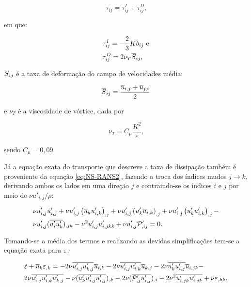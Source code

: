\begin{equation}
    \tau_{ij}=\tau_{ij}^I+\tau_{ij}^D\text{,}
\end{equation}

\noindent em que:

\begin{subequations}
    \begin{align}
         & \tau_{ij}^I=-\frac{2}{3}K\delta_{ij}\text{ e} \\
         & \tau_{ij}^D=2\nu_T\overline{S}_{ij}\text{,}
    \end{align}
\end{subequations}

\noindent $\overline{S}_{ij}$ é a taxa de deformação do campo de velocidades média:

\begin{equation}
    \overline{S}_{ij}=\frac{\overline{u}_{i,j}+\overline{u}_{j,i}}{2}
\end{equation}

\noindent e $\nu_T$ é a viscosidade de vórtice, dada por

\begin{equation}
    \nu_T=C_\mu\frac{K^2}{\varepsilon}\text{,}
\end{equation}

\noindent sendo $C_\mu=0,09$.

Já a equação exata do transporte que descreve a taxa de dissipação também é proveniente da equação \eqref{eq:NS-RANS2}, fazendo a troca dos índices mudos $j\to k$, derivando ambos os lados em uma direção $j$ e contraindo-se os índices $i$ e $j$ por meio de $\nu u'_{i,j}/\rho$:

\begin{equation}
    \begin{split}
        &\nu u'_{i,j}\dot{u}'_{i,j}+\nu u'_{i,j}\left({\overline{u}_ku'_{i,k}}\right)_{,j}+\nu u'_{i,j}\left({u'_k\overline{u}_{i,k}}\right)_{,j}+\nu u'_{i,j}\left({u'_ku'_{i,k}}\right)_{,j}-\\
        &\nu u'_{i,j}(\overline{u'_iu'_k})_{,jk}-\nu^2u'_{i,j}u'_{i,jkk}+\nu u'_{i,j}\mathcal{P}'_{,ij}=0\text{.}
    \end{split}
\end{equation}

Tomando-se a média dos termos e realizando as devidas simplificações tem-se a equação exata para $\varepsilon$:

\begin{equation}
    \begin{split}
        &\dot{\varepsilon}+\overline{u}_k\varepsilon_{,k}=-2\nu\overline{u'_{i,j}u'_{k,j}}\overline{u}_{i,k}-2\nu\overline{u'_{i,j}u'_{i,k}}\overline{u}_{k,j}-2\nu\overline{u'_ku'_{i,j}}\overline{u}_{i,jk}-\\
        &2\nu\overline{u'_{i,j}u'_{i,k}u'_{k,j}}-\nu(\overline{u'_ku'_{i,j}u'_{i,j}})_{,k}-2\nu(\overline{\mathcal{P}'_{,j}u'_{i,j}})_{,i}-2\nu^2\overline{u'_{i,jk}u'_{i,jk}}+\nu\varepsilon_{,kk}\text{.}
    \end{split}
\end{equation}

